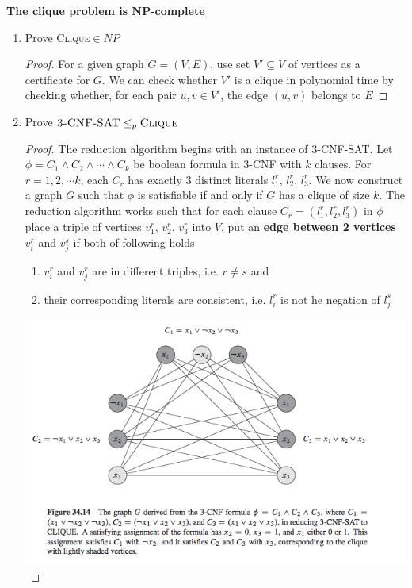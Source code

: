 \documentclass[11pt]{article}
\begin{document}
\begin{theorem*}
    \textbf{The clique problem is NP-complete}
    \begin{enumerate}
        \item Prove \textsc{Clique}$\in NP$ 
        \begin{proof}
            For a given graph $G = (V,E)$, use set $V'\subseteq V$ of vertices as a certificate for $G$. We can check whether $V'$ is a clique in polynomial time by checking whether, for each pair $u,v\in V'$, the edge $(u,v)$ belongs to $E$ 
        \end{proof}
        \item Prove $\textsc{3-CNF-SAT} \leq_p \textsc{Clique}$
        \begin{proof}
            The reduction algorithm begins with an instance of \textsc{3-CNF-SAT}. Let $\phi = C_1 \land C_2 \land \cdots \land C_k$ be boolean formula in 3-CNF with $k$ clauses. For $r = 1, 2, \cdots k$, each $C_r$ has exactly 3 distinct literals $l_1^r$, $l_2^r$, $l_3^r$. We now construct a graph $G$ such that $\phi$ is satisfiable if and only if $G$ has a clique of size $k$. The reduction algorithm works such that for each clause $C_r = (l_1^r, l_2^r, l_3^r)$ in $\phi$ place a triple of vertices $v_1^r$, $v_2^r$, $v_3^r$ into $V$, put an \textbf{edge between 2 vertices} $v_i^r$ and $v_j^s$ if both of following holds 
            \begin{enumerate}
                \item $v_i^r$ and $v_j^r$ are in different triples, i.e. $r\neq s$ and 
                \item their corresponding literals are consistent, i.e. $l_i^r$ is not he negation of $l_j^s$
            \end{enumerate}
            \includegraphics[width=\textwidth]{clique_proof.png}

\end{proof}
\end{enumerate}
\end{theorem*}
\end{document}
